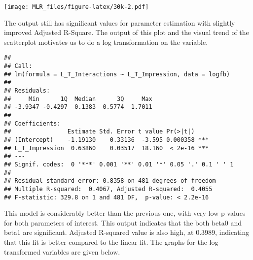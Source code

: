 \documentclass[
]{article}
\newenvironment{Shaded}{\begin{snugshade}}{\end{snugshade}}
\newcommand{\CommentTok}[1]{\textcolor[rgb]{0.56,0.35,0.01}{\textit{#1}}}
\newcommand{\DataTypeTok}[1]{\textcolor[rgb]{0.13,0.29,0.53}{#1}}
\newcommand{\FloatTok}[1]{\textcolor[rgb]{0.00,0.00,0.81}{#1}}
\newcommand{\KeywordTok}[1]{\textcolor[rgb]{0.13,0.29,0.53}{\textbf{#1}}}
\newcommand{\NormalTok}[1]{#1}
\newcommand{\OperatorTok}[1]{\textcolor[rgb]{0.81,0.36,0.00}{\textbf{#1}}}
\newcommand{\StringTok}[1]{\textcolor[rgb]{0.31,0.60,0.02}{#1}}
\begin{document}
\texttt{[image: MLR\_files/figure-latex/30k-2.pdf]}

The output still has significant values for parameter estimation with
slightly improved Adjusted R-Square. The output of this plot and the
visual trend of the scatterplot motivates us to do a log transformation
on the variable.

\begin{Shaded}
\end{Shaded}

\begin{verbatim}
## 
## Call:
## lm(formula = L_T_Interactions ~ L_T_Impression, data = logfb)
## 
## Residuals:
##     Min      1Q  Median      3Q     Max 
## -3.9347 -0.4297  0.1383  0.5774  1.7011 
## 
## Coefficients:
##                Estimate Std. Error t value Pr(>|t|)    
## (Intercept)    -1.19130    0.33136  -3.595 0.000358 ***
## L_T_Impression  0.63860    0.03517  18.160  < 2e-16 ***
## ---
## Signif. codes:  0 '***' 0.001 '**' 0.01 '*' 0.05 '.' 0.1 ' ' 1
## 
## Residual standard error: 0.8358 on 481 degrees of freedom
## Multiple R-squared:  0.4067, Adjusted R-squared:  0.4055 
## F-statistic: 329.8 on 1 and 481 DF,  p-value: < 2.2e-16
\end{verbatim}

This model is considerably better than the previous one, with very low p
values for both parameters of interest. This output indicates that the
both beta0 and beta1 are significant. Adjusted R-squared value is also
high, at 0.3989, indicating that this fit is better compared to the
linear fit. The graphs for the log-transformed variables are given
below.

\begin{Shaded}
\end{Shaded}
\end{document}

